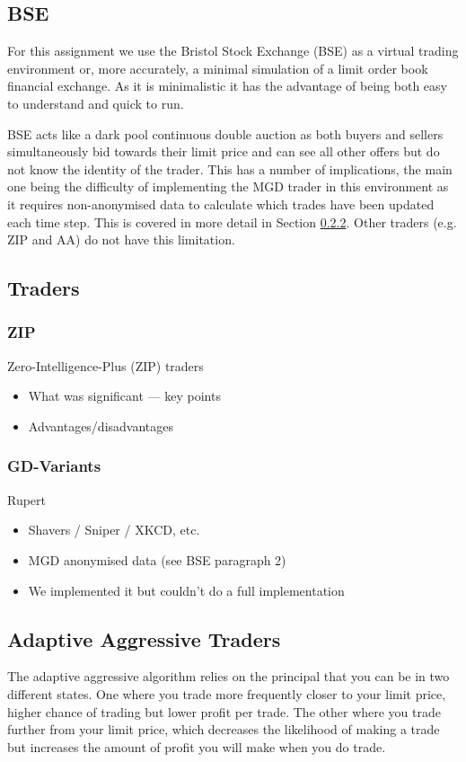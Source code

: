 \documentclass{acm_proc_article-sp}
\begin{document}
\subsection{BSE} \label{sec:BSE}
For this assignment we use the Bristol Stock Exchange (BSE) as a virtual trading environment or, 
more accurately, a minimal simulation of a limit order book financial exchange. As it is 
minimalistic it has the advantage of being both easy to understand and quick to run.

BSE acts like a dark pool continuous double auction as both buyers and sellers simultaneously bid 
towards their limit price and can see all other offers but do not know the identity of the trader. 
This has a number of implications, the main one being the difficulty of implementing the MGD trader 
in this environment as it requires non-anonymised data to calculate which trades have been updated 
each time step. This is covered in more detail in Section \ref{sec:traders_GDV}. Other traders (e.g. 
ZIP and AA) do not have this limitation.\\


\subsection{Traders} \label{sec:traders}
\subsubsection{ZIP} \label{sec:traders_ZIP}
Zero-Intelligence-Plus (ZIP) traders
\begin{itemize} \itemsep0pt
	\item What was significant --- key points
	\item Advantages/disadvantages
\end{itemize}

\subsubsection{GD-Variants} \label{sec:traders_GDV}
Rupert
\begin{itemize} \itemsep0pt
	\item Shavers / Sniper / XKCD, etc.
	\item MGD anonymised data (see BSE paragraph 2)
	\item We implemented it but couldn't do a full implementation
\end{itemize}

\pagebreak
\subsection{Adaptive Aggressive Traders} \label{sec:AA}
The adaptive aggressive algorithm relies on the principal that you can be in
two different states. One where you trade more frequently closer to your limit
price, higher chance of trading but lower profit per trade. The other where you
trade further from your limit price, which decreases the likelihood of making a
trade but increases the amount of profit you will make when you do trade.
\end{document}
